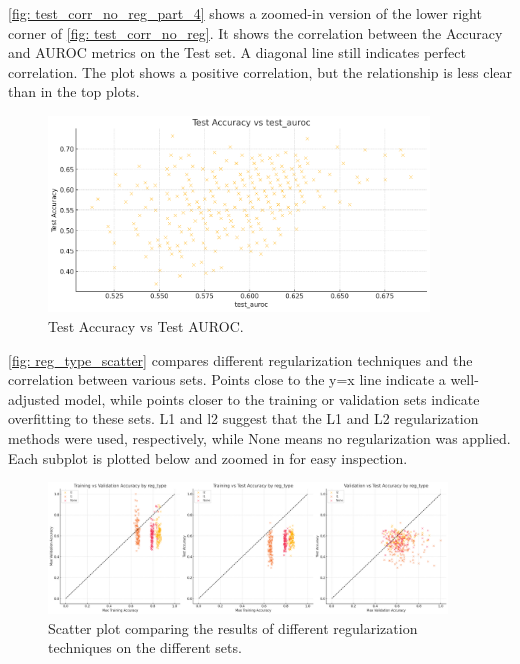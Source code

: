\autoref{fig: test_corr_no_reg_part_4} shows a zoomed-in version of the lower right corner of \autoref{fig: test_corr_no_reg}. It shows the correlation between the Accuracy and AUROC metrics on the Test set. A diagonal line still indicates perfect correlation. The plot shows a positive correlation, but the relationship is less clear than in the top plots. 
\begin{figure}[H]
    \centering
    \includegraphics[width=0.9\textwidth]{Figures/results/acc_corr_no_reg_part_4.png}
    \caption{Test Accuracy vs Test AUROC.}
    \label{fig: test_corr_no_reg_part_4}
\end{figure}


\autoref{fig: reg_type_scatter} compares different regularization techniques and the correlation between various sets. Points close to the y=x line indicate a well-adjusted model, while points closer to the training or validation sets indicate overfitting to these sets. L1 and l2 suggest that the L1 and L2 regularization methods were used, respectively, while None means no regularization was applied. Each subplot is plotted below and zoomed in for easy inspection.
\begin{figure}[H]
    \centering
    \includegraphics[width=400px]{Figures/results/scatter_reg_type.png}
    \caption{Scatter plot comparing the results of different regularization techniques on the different sets.}
    \label{fig: reg_type_scatter}
\end{figure}

